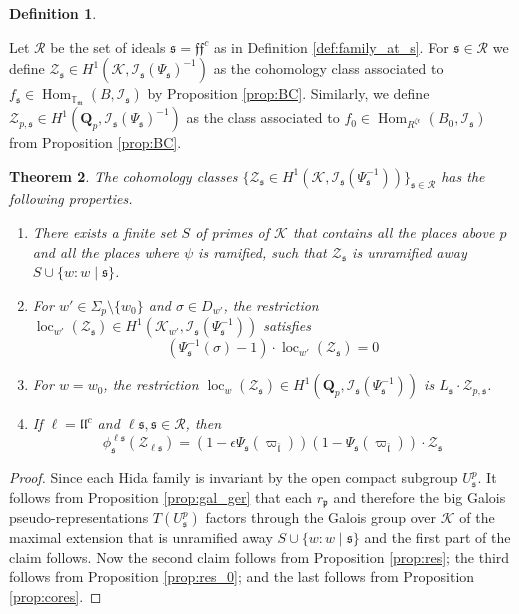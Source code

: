 \documentclass[leqno]{amsart}
\newtheorem{thm}{Theorem}[section]
\theoremstyle{definition}
\newtheorem{defn}[thm]{Definition}
\theoremstyle{remark}
\newcommand{\Qp}{\mathbf{Q}_p}
\DeclareMathOperator{\Hom}{Hom}
\newcommand{\ff}{\mathfrak{f}}
\newcommand{\fl}{\mathfrak{l}}
\newcommand{\fm}{\mathfrak{m}}
\newcommand{\fp}{\mathfrak{p}}
\newcommand{\fs}{\mathfrak{s}}
\newcommand{\K}{{\mathcal{K}}} %
\newcommand{\TT}{\mathbb{T}} %
\newcommand{\I}{\mathcal{I}} %
\DeclareMathOperator{\loc}{loc}
\begin{document}
\begin{defn}\label{def:bigEuler}

Let $\mathcal{R}$ be the set of ideals
$\fs=\ff\ff^c$ as in Definition \ref{def:family_at_s}.
For $\fs\in\mathcal{R}$ we define
$\mathcal{Z}_\fs\in H^1(\K,\I_\fs(\Psi_\fs)^{-1})$
as the cohomology class
associated to $f_\fs\in \Hom_{\TT_\fm}(B,\I_\fs)$
by Proposition \ref{prop:BC}.
Similarly, we define 
$\mathcal{Z}_{p,\fs}\in H^1(\Qp,\I_\fs(\Psi_\fs)^{-1})$
as the class associated to 
$f_0\in \Hom_{R^{\zeta\epsilon}}(B_0,\I_\fs)$
from Proposition \ref{prop:BC}.


\end{defn}


\begin{thm}\label{thm:Bigeu}
The cohomology classes
$\{\mathcal{Z}_\fs\in H^1(\K, \I_\fs(\Psi_\fs^{-1}))\}_{\fs\in\mathcal{R}}$
has the following properties.
\begin{enumerate}
    \item There exists a finite set $S$ of primes of $\K$
    that contains all the places above $p$ and all the 
    places where $\psi$ is ramified, such that 
    $\mathcal{Z}_{\fs}$ is unramified away 
    $S\cup \{w\colon w\mid \fs\}$.
    \item For $w'\in \Sigma_p\setminus\{w_0\}$
    and $\sigma\in D_{w'}$, the restriction
    $\loc_{w'}(\mathcal{Z}_\fs)\in H^1(\K_{w'}, \I_\fs(\Psi_\fs^{-1}))$
    satisfies 
    \[
        (\Psi_{\fs}^{-1}(\sigma)-1)\cdot \loc_{w'}(\mathcal{Z}_\fs)=0
    \]
    \item For $w=w_0$, the restriction 
    $\loc_{w}(\mathcal{Z}_\fs)\in H^1(\Qp, \I_\fs(\Psi_\fs^{-1}))$
    is $L_\fs\cdot \mathcal{Z}_{p,\fs}$.
    \item If $\ell=\fl\fl^c$ and $\ell\fs,\fs\in \mathcal{R}$, then
    \[
        \phi^{\ell\fs}_\fs(\mathcal{Z}_{\ell\fs})=
        (1-\epsilon\Psi_{\fs}(\varpi_{\bar{\fl}}))
        (1-\Psi_\fs(\varpi_{\bar{\fl}}))\cdot 
        \mathcal{Z}_{\fs}
    \]
\end{enumerate}
\end{thm}
\begin{proof}
Since each Hida family is invariant 
by the open compact subgroup $U^p_{\fs}$.
It follows from Proposition \ref{prop:gal_ger}
that each $r_\fp$ and therefore the big Galois pseudo-representations
$T(U^p_\fs)$ factors through the Galois group over $\K$
of the maximal extension that is unramified away 
$S\cup \{w\colon w\mid \fs\}$ and the first part of the claim follows.
Now the second claim follows from
Proposition \ref{prop:res};
the third follows from
Proposition \ref{prop:res_0};
and the last follows from
Proposition \ref{prop:cores}.
\end{proof}
\end{document}
